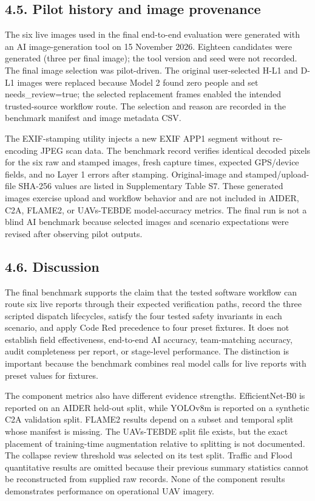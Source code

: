 \documentclass[pdflatex,sn-mathphys-ay]{sn-jnl}
\begin{document}
\subsection*{4.5. Pilot history and image provenance}

The six live images used in the final end-to-end evaluation were generated with an AI image-generation tool on 15 November 2026. Eighteen candidates were generated (three per final image); the tool version and seed were not recorded. The final image selection was pilot-driven. The original user-selected H-L1 and D-L1 images were replaced because Model 2 found zero people and set needs\_review=true; the selected replacement frames enabled the intended trusted-source workflow route. The selection and reason are recorded in the benchmark manifest and image metadata CSV.

The EXIF-stamping utility injects a new EXIF APP1 segment without re-encoding JPEG scan data. The benchmark record verifies identical decoded pixels for the six raw and stamped images, fresh capture times, expected GPS/device fields, and no Layer 1 errors after stamping. Original-image and stamped/upload-file SHA-256 values are listed in Supplementary Table S7. These generated images exercise upload and workflow behavior and are not included in AIDER, C2A, FLAME2, or UAVs-TEBDE model-accuracy metrics. The final run is not a blind AI benchmark because selected images and scenario expectations were revised after observing pilot outputs.

\subsection*{4.6. Discussion}

The final benchmark supports the claim that the tested software workflow can route six live reports through their expected verification paths, record the three scripted dispatch lifecycles, satisfy the four tested safety invariants in each scenario, and apply Code Red precedence to four preset fixtures. It does not establish field effectiveness, end-to-end AI accuracy, team-matching accuracy, audit completeness per report, or stage-level performance. The distinction is important because the benchmark combines real model calls for live reports with preset values for fixtures.

The component metrics also have different evidence strengths. EfficientNet-B0 is reported on an AIDER held-out split, while YOLOv8m is reported on a synthetic C2A validation split. FLAME2 results depend on a subset and temporal split whose manifest is missing. The UAVs-TEBDE split file exists, but the exact placement of training-time augmentation relative to splitting is not documented. The collapse review threshold was selected on its test split. Traffic and Flood quantitative results are omitted because their previous summary statistics cannot be reconstructed from supplied raw records. None of the component results demonstrates performance on operational UAV imagery.
\end{document}
